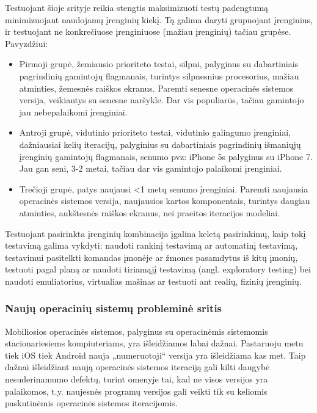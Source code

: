 \documentclass{VUMIFPSkursinis}
\begin{document}
Testuojant šioje srityje reikia stengtis maksimizuoti testų padengtumą minimizuojant naudojamų įrenginių kiekį. Tą galima daryti grupuojant įrenginius, ir testuojant ne konkrečiuose įrenginiuose (mažiau įrenginių) tačiau grupėse. Pavyzdžiui:

\begin{itemize}
   \item Pirmoji grupė, žemiausio prioriteto testai, silpni, palyginus su dabartiniais pagrindinių gamintojų flagmanais, turintys silpnesnius procesorius, mažiau atminties, žemesnės raiškos ekranus. Paremti senesne operacinės sistemos versija, veikiantys su senesne naršykle. Dar vis populiarūs, tačiau gamintojo jau nebepalaikomi įrenginiai.

   \item Antroji grupė, vidutinio prioriteto testai, vidutinio galingumo įrenginiai, dažniausiai kelių iteracijų, palyginius su dabartiniais pagrindinių išmaniųjų įrenginių gamintojų flagmanais, senumo pvz: iPhone 5s palyginus su iPhone 7. Jau gan seni, 3-2 metai, tačiau dar vis gamintojo palaikomi įrenginiai.

   \item Trečioji grupė, patys naujausi <1 metų senumo įrenginiai. Paremti naujausia operacinės sistemos versija, naujausios kartos komponentais, turintys daugiau atminties, aukštesnės raiškos ekranus, nei praeitos iteracijos modeliai.\cite{6496451}
\end{itemize}

Testuojant pasirinkta įrenginių kombinacija įgalina keletą pasirinkimų, kaip tokį testavimą galima vykdyti: naudoti rankinį testavimą ar automatinį testavimą, testavimui pasitelkti komandas įmonėje ar žmones pasamdytus iš kitų įmonių, testuoti pagal planą ar naudoti tiriamąjį testavimą (angl. exploratory testing) bei naudoti emuliatorius, virtualias mašinas ar testuoti ant realių, fizinių įrenginių.

\subsubsection{Naujų operacinių sistemų probleminė sritis}
Mobiliosios operacinės sistemos, palyginus su operacinėmis sistemomis stacionariesiems kompiuteriams, yra išleidžiamos labai dažnai. Pastaruoju metu tiek iOS tiek Android nauja „numeruotoji“ versija yra išleidžiama kas met. Taip dažnai išleidžiant naują operacinės sistemos iteraciją gali kilti daugybė nesuderinamumo defektų, turint omenyje tai, kad ne visos versijos yra palaikomos, t.y. naujesnės programų versijos gali veikti tik su keliomis paskutinėmis operacinės sistemos iteracijomis.
\end{document}
